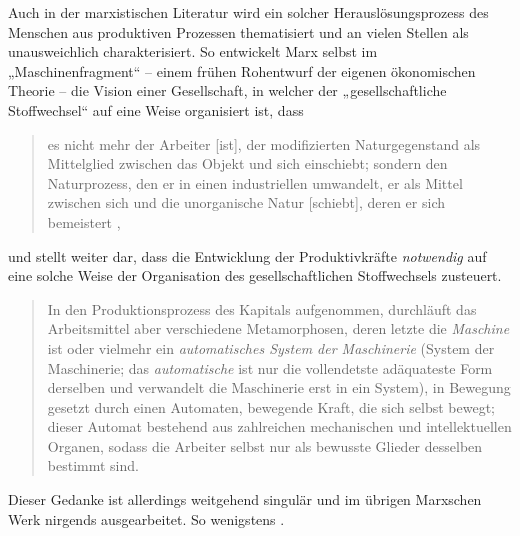 \documentclass[11pt,a4paper]{article}
\begin{document}
Auch in der marxistischen Literatur wird ein solcher Herauslösungsprozess des
Menschen aus produktiven Prozessen thematisiert und an vielen Stellen als
unausweichlich charakterisiert.  So entwickelt Marx selbst im
„Maschinenfragment“ \cite[S. 570 ff.]{MEW42} -- einem frühen Rohentwurf der
eigenen ökonomischen Theorie -- die Vision einer Gesellschaft, in welcher der
„gesellschaftliche Stoffwechsel“ \cite[S. 37]{MEW23} auf eine Weise
organisiert ist, dass
\begin{quote}
  es nicht mehr der Arbeiter [ist], der modifizierten Naturgegenstand als
  Mittelglied zwischen das Objekt und sich einschiebt; sondern den
  Naturprozess, den er in einen industriellen umwandelt, er als Mittel
  zwischen sich und die unorganische Natur [schiebt], deren er sich
  bemeistert \cite[S. 572]{MEW42},
\end{quote}
und stellt weiter dar, dass die Entwicklung der Produktivkräfte
\emph{notwendig} auf eine solche Weise der Organisation des gesellschaftlichen
Stoffwechsels zusteuert.
\begin{quote}
  In den Produktionsprozess des Kapitals aufgenommen, durchläuft das
  Arbeitsmittel aber verschiedene Metamorphosen, deren letzte die
  \emph{Maschine} ist oder vielmehr ein \emph{automatisches System der
    Maschinerie} (System der Maschinerie; das \emph{automatische} ist nur die
  vollendetste adäquateste Form derselben und verwandelt die Maschinerie erst
  in ein System), in Bewegung gesetzt durch einen Automaten, bewegende Kraft,
  die sich selbst bewegt; dieser Automat bestehend aus zahlreichen mechanischen
  und intellektuellen Organen, sodass die Arbeiter selbst nur als bewusste
  Glieder desselben bestimmt sind. \cite[S. 584]{MEW42}
\end{quote}
Dieser Gedanke ist allerdings weitgehend singulär und im übrigen Marxschen
Werk nirgends ausgearbeitet. So wenigstens \cite{Goldberg2016}.
\end{document}
